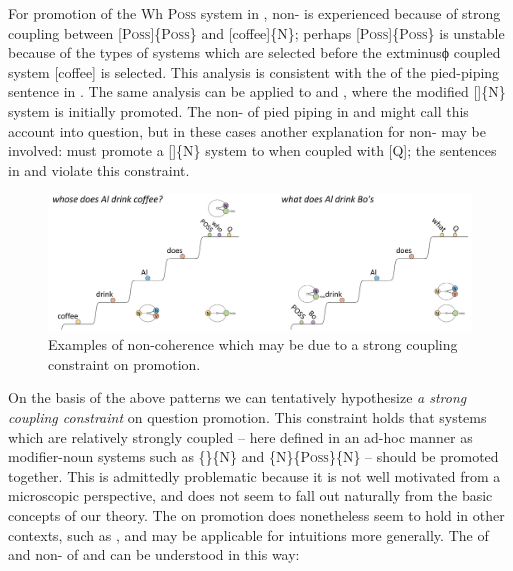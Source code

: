 For promotion of the {\textbar}Wh P\textsc{oss}{\textbar} system in , non- is experienced because of strong coupling between [P\textsc{oss}]\linebreak\{P\textsc{oss}\} and [coffee]\{N\}; perhaps [P\textsc{oss}]\{P\textsc{oss}\} is unstable because of the types of systems which are selected before the 	extminus{}ϕ coupled system [coffee] is selected. This analysis is consistent with the  of the pied-piping sentence in . The same analysis can be applied to  and , where the modified []\{N\} system is initially promoted. The non- of pied piping in  and  might call this account into question, but in these cases another explanation for non- may be involved:  must promote a []\{N\} system to  when coupled with [Q]; the sentences in  and  violate this constraint. 

  
\begin{figure}
\includegraphics[width=\textwidth]{figures/Tilsen-img166.png}
\caption{Examples of non-coherence which may be due to a strong coupling constraint on promotion.}
\label{fig:7:22}
\end{figure}
 

  On the basis of the above patterns we can tentatively hypothesize \textit{a strong coupling constraint} on question promotion. This constraint holds that systems which are relatively strongly coupled -- here defined in an ad-hoc manner as modifier-noun systems such as \{\}\{N\} and \{N\}\{P\textsc{oss}\}\{N\} -- should be promoted together. This is admittedly problematic because it is not well motivated from a microscopic perspective, and does not seem to fall out naturally from the basic concepts of our theory. The  on promotion does nonetheless seem to hold in other contexts, such as , and may be applicable for  intuitions more generally. The  of  and non- of  and  can be understood in this way:

